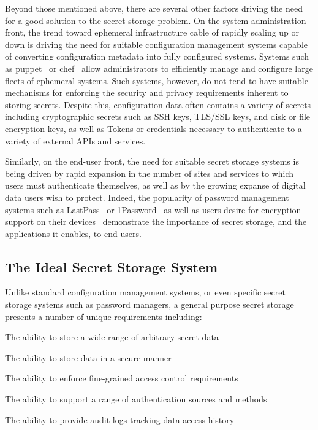 Beyond those mentioned above, there are several other factors driving
the need for a good solution to the secret storage problem. On the
system administration front, the trend toward ephemeral infrastructure
cable of rapidly scaling up or down is driving the need for suitable
configuration management systems capable of converting configuration
metadata into fully configured systems. Systems such as
puppet~\cite{puppet} or chef~\cite{chef} allow administrators to
efficiently manage and configure large fleets of ephemeral
systems. Such systems, however, do not tend to have suitable
mechanisms for enforcing the security and privacy requirements
inherent to storing secrets. Despite this, configuration data often 
contains a variety of secrets including cryptographic secrets such as 
SSH keys, TLS/SSL keys, and disk or file encryption keys, as well as 
Tokens or credentials necessary to authenticate to a variety of 
external APIs and services.

Similarly, on the end-user front, the need for suitable secret storage
systems is being driven by rapid expansion in the number of sites
and services to which users must authenticate themselves, as well as by
the growing expanse of digital data users wish to protect. Indeed, the
popularity of password management systems such as
LastPass~\cite{lastpass} or 1Password~\cite{onepassword} as well as
users desire for encryption support on their
devices~\cite{intercept-cookencryption} demonstrate the importance of
secret storage, and the applications it enables, to end users.

\subsection{The Ideal Secret Storage System}

Unlike standard configuration management systems, or even specific
secret storage systems such as password managers, a general purpose
secret storage presents a number of unique requirements including:

\begin{packed_item}
\item The ability to store a wide-range of arbitrary secret data
\item The ability to store data in a secure manner
\item The ability to enforce fine-grained access control requirements
\item The ability to support a range of authentication sources and methods
\item The ability to provide audit logs tracking data access history
\end{packed_item}


